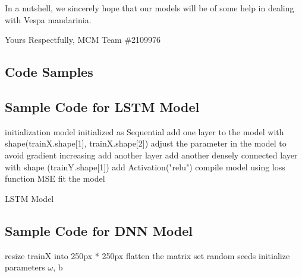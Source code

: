\documentclass{mcmthesis}
\begin{document}
In a nutshell, we sincerely hope that our models will be of some help in dealing with Vespa mandarinia.


Yours Respectfully,
MCM Team \#2109976



\newpage

\begin{appendices}
\section{Code Samples}
\subsection{Sample Code for LSTM Model}

\begin{algorithm}[H]
  \SetAlgoLined

  initialization\;
   {
    model initialized as Sequential\;
    add one layer to the model with shape(trainX.shape[1], trainX.shape[2])\;
    adjust the parameter in the model to avoid gradient increasing\;
    add another layer\;
    add another densely connected layer with shape (trainY.shape[1])\;
    add Activation("relu")\;
    compile model using loss function MSE\;
    fit the model \;
    }
  \caption{LSTM Model}
\end{algorithm}


\subsection{Sample Code for DNN Model}
\begin{algorithm}[H]
  \SetAlgoLined
    resize trainX into 250px * 250px\;
    flatten the matrix\;
  set random seeds\;
  initialize parameters $\omega$, b\;
  

\end{algorithm}
\end{appendices}
\end{document}
